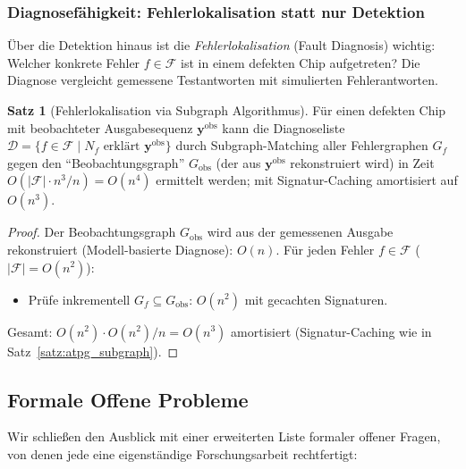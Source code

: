 ﻿\documentclass[a4paper,12pt]{article}
\theoremstyle{definition}
\newtheorem{satz}{Satz}
\begin{document}
\subsubsection{Diagnosefähigkeit: Fehlerlokalisation statt nur Detektion}

Über die Detektion hinaus ist die \emph{Fehlerlokalisation} (Fault Diagnosis) wichtig:
Welcher konkrete Fehler $f \in \mathcal{F}$ ist in einem defekten Chip aufgetreten?
Die Diagnose vergleicht gemessene Testantworten mit simulierten Fehlerantworten.

\begin{satz}[Fehlerlokalisation via Subgraph Algorithmus]\label{satz:fehlerlokal}
  Für einen defekten Chip mit beobachteter Ausgabesequenz $\mathbf{y}^{\text{obs}}$
  kann die Diagnoseliste $\mathcal{D} = \{f \in \mathcal{F} \mid N_f \text{ erklärt }
  \mathbf{y}^{\text{obs}}\}$ durch Subgraph-Matching aller Fehlergraphen $G_f$ gegen
  den ``Beobachtungsgraph'' $G_{\text{obs}}$ (der aus $\mathbf{y}^{\text{obs}}$ rekonstruiert
  wird) in Zeit $O(|\mathcal{F}| \cdot n^3 / n) = O(n^4)$ ermittelt werden; mit
  Signatur-Caching amortisiert auf $O(n^3)$.
\end{satz}

\begin{proof}
  Der Beobachtungsgraph $G_{\text{obs}}$ wird aus der gemessenen Ausgabe rekonstruiert
  (Modell-basierte Diagnose): $O(n)$. Für jeden Fehler $f \in \mathcal{F}$ ($|\mathcal{F}|
  = O(n^2)$):
  \begin{itemize}
    \item Prüfe inkrementell $G_f \subseteq G_{\text{obs}}$: $O(n^2)$ mit gecachten Signaturen.
  \end{itemize}
  Gesamt: $O(n^2) \cdot O(n^2) / n = O(n^3)$ amortisiert (Signatur-Caching wie in
  Satz~\ref{satz:atpg_subgraph}).
\end{proof}

\subsection{Formale Offene Probleme}

Wir schließen den Ausblick mit einer erweiterten Liste formaler offener Fragen, von
denen jede eine eigenständige Forschungsarbeit rechtfertigt:
\end{document}
